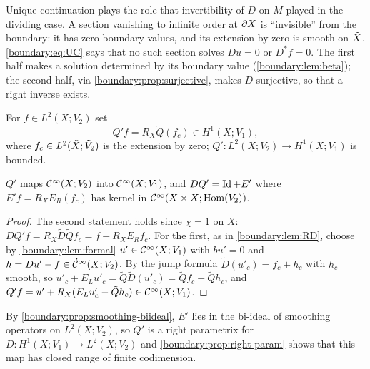 \begin{discussion}
Unique continuation plays the role that invertibility of $D$ on $M$ played in the
dividing case. A section vanishing to infinite order at $\partial X$ is ``invisible'' from
the boundary: it has zero boundary values, and its extension by zero is smooth on
$\tilde{X}$. \eqref{boundary:eq:UC} says that no such section solves $Du=0$ or $D^*f=0$.
The first half makes a solution determined by its boundary value
(\cref{boundary:lem:beta}); the second half, via
\cref{boundary:prop:surjective}, makes $D$ surjective, so that a right inverse
exists.
\end{discussion}

For $f\in L^2(X;V_2)$ set
\begin{equation*}
Q'f=R_X\tilde Q(f_c)\in H^1(X;V_1),
\end{equation*}
where $f_c\in L^2(\tilde{X};\tilde V_2)$ is the extension by zero; $Q':L^2(X;V_2)\to
H^1(X;V_1)$ is bounded.

\begin{lemma}\label{boundary:lem:Qprime}
$Q'$ maps $\mathcal{C}^\infty(X;V_2)$ into $\mathcal{C}^\infty(X;V_1)$, and $DQ'=\operatorname{Id}+E'$ where $E'f=R_XE_R(f_c)$
has kernel in $\mathcal{C}^\infty(X\times X;\operatorname{Hom}(V_2))$.
\end{lemma}
\begin{proof}
The second statement holds since $\chi=1$ on $X$: $DQ'f=R_X\tilde D\tilde Qf_c=
f+R_XE_Rf_c$. For the first, as in \cref{boundary:lem:RD}, choose by
\cref{boundary:lem:formal} $u'\in\mathcal{C}^\infty(X;V_1)$ with $bu'=0$ and $h=Du'-f\in\dot{\mathcal{C}}^\infty(X;V_2)$.
By the jump formula $\tilde D(u'_c)=f_c+h_c$ with $h_c$ smooth, so
$u'_c+E_Lu'_c=\tilde Q\tilde D(u'_c)=\tilde Qf_c+\tilde Qh_c$, and $Q'f=u'+R_X(E_Lu'_c
-\tilde Qh_c)\in\mathcal{C}^\infty(X;V_1)$.
\end{proof}

By \cref{boundary:prop:smoothing-biideal}, $E'$ lies in the bi-ideal of smoothing
operators on $L^2(X;V_2)$, so $Q'$ is a right parametrix for $D:H^1(X;V_1)\to
L^2(X;V_2)$ and \cref{boundary:prop:right-param} shows that this map has closed range
of finite codimension.

